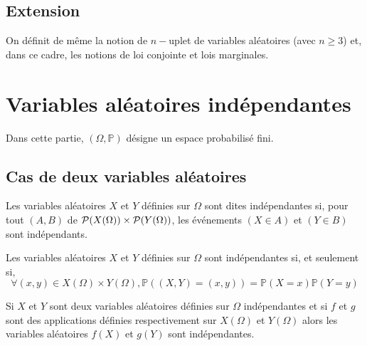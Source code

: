 \subsection{Extension}
\begin{defprop}
    On définit de même la notion de \(n-\)uplet de variables aléatoires (avec \(n \geq 3\)) et, dans ce cadre, les notions de loi conjointe et lois marginales.
\end{defprop}
\section{Variables aléatoires indépendantes}
    Dans cette partie, \((\Omega, \mathbb{P})\) désigne un espace probabilisé fini.
\subsection{Cas de deux variables aléatoires}
\begin{defi}
    Les variables aléatoires \(X\) et \(Y\) définies sur \(\Omega\) sont dites indépendantes si, pour tout \((A, B)\) de \(\cal{P} (X(\Omega)) \times \cal{P} (Y (\Omega))\), les événements \((X \in  A)\) et \((Y \in  B)\) sont indépendants.
\end{defi}
\begin{defprop}[Caractérisation]
    Les variables aléatoires \(X\) et \(Y\) définies sur \(\Omega\) sont indépendantes si, et seulement si,
        \[\forall (x, y) \in  X(\Omega) \times Y (\Omega), \mathbb{P} ((X, Y ) = (x, y)) = \mathbb{P}(X = x)\mathbb{P}(Y = y)\]
\end{defprop}
\begin{defprop}
    Si \(X\) et \(Y\) sont deux variables aléatoires définies sur \(\Omega\) indépendantes et si \(f\) et \(g\) sont des applications définies respectivement sur \(X(\Omega)\) et \(Y (\Omega)\) alors les variables aléatoires \(f (X)\) et \(g(Y )\) sont indépendantes.
\end{defprop}
